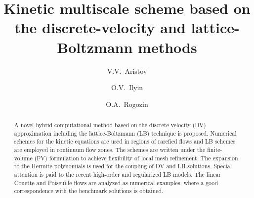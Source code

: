 \documentclass{elsarticle} %
\begin{document}
\begin{frontmatter}

\title{Kinetic multiscale scheme based on the discrete-velocity and lattice-Boltzmann methods}

\author[ccas]{V.V.~Aristov}

\author[ccas]{O.V.~Ilyin}

\author[skoltech,ccas]{O.A.~Rogozin}



\address[ccas]{Dorodnicyn Computing Center,
    Federal Research Center "Computer Science and Control" of Russian Academy of Science, Moscow, Russia}
\address[skoltech]{Center for Design, Manufacturing, and Materials,
    Skolkovo Institute of Science and Technology, Moscow, Russia}

\begin{abstract}

A novel hybrid computational method based on the discrete-velocity (DV) approximation including the lattice-Boltzmann (LB) technique is proposed.
Numerical schemes for the kinetic equations are used in regions of rarefied flows and LB schemes are employed in continuum flow zones.
The schemes are written under the finite-volume (FV) formulation to achieve flexibility of local mesh refinement.
The expansion to the Hermite polynomials is used for the coupling of DV and LB solutions.
Special attention is paid to the recent high-order and regularized LB models.
The linear Couette and Poiseuille flows are analyzed as numerical examples,
where a good correspondence with the benchmark solutions is obtained.






\end{abstract}
\end{frontmatter}
\end{document}
